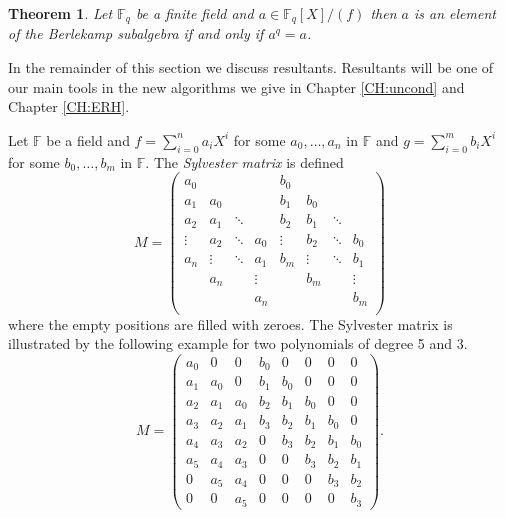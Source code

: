 \documentclass{article}
\newcounter{dummy} \numberwithin{dummy}{section}
\theoremstyle{plain}
\newtheorem{thm}[dummy]{Theorem}
\theoremstyle{definition}
\def\Fq {{ \mathbb{F} _ {q} }}
\begin{document}
		\begin{thm}
		\label{THM:inBerle}
		    Let $\Fq$ be a finite field and $a \in \Fq[X]/(f)$ then $a$ is an element of the Berlekamp subalgebra if and only if $a^q=a$. 
		\end{thm}
		
		In the remainder of this section we discuss resultants. Resultants will be one of our main tools in the new algorithms we give in Chapter \ref{CH:uncond} and Chapter \ref{CH:ERH}.
		
		Let $\mathbb{F}$ be a field and $f=\sum_{i=0}^n{a_iX^i}$ for some $a_0,\ldots,a_n$ in $\mathbb{F}$ and $g=\sum_{i=0}^m{b_iX^i}$ for some $b_0,\ldots,b_m$ in $\mathbb{F}$. The \emph{Sylvester matrix} is defined	
      \[M=
      \begin{pmatrix}
          a_0    &        &        &         & b_0     &          &          &        \\
          a_1    & a_0    &        &         & b_1     & b_0      &          &        \\
					a_2    & a_1    & \ddots &         & b_2     & b_1      & \ddots   &        \\
					\vdots & a_2    & \ddots & a_0     & \vdots  & b_2      & \ddots   & b_0    \\
					a_n    & \vdots & \ddots & a_1     & b_m     & \vdots   & \ddots   & b_1    \\
					       & a_n    &        & \vdots  &         & b_m      &          & \vdots \\
								 &        &        & a_n     &         &          &          & b_m    \\
      \end{pmatrix}
  		\]	
			\noindent where the empty positions are filled with zeroes. The Sylvester matrix is illustrated by the following example for two polynomials of degree 5 and 3.	
			\[
      M=
      \begin{pmatrix} 
            a_0 & 0   & 0   & b_0   & 0   & 0   & 0   & 0  \\
            a_1 & a_0 & 0   & b_1   & b_0 & 0   & 0   & 0  \\
					  a_2 & a_1 & a_0 & b_2   & b_1 & b_0 & 0   & 0  \\
					  a_3 & a_2 & a_1 & b_3   & b_2 & b_1 & b_0 & 0  \\
					  a_4 & a_3 & a_2 & 0     & b_3 & b_2 & b_1 & b_0\\
					  a_5 & a_4 & a_3 & 0     & 0   & b_3 & b_2 & b_1\\
					  0   & a_5 & a_4 & 0     & 0   & 0   & b_3 & b_2\\
					  0   & 0   & a_5 & 0     & 0   & 0   & 0   & b_3
			\end{pmatrix}
      .\]
\end{document}
